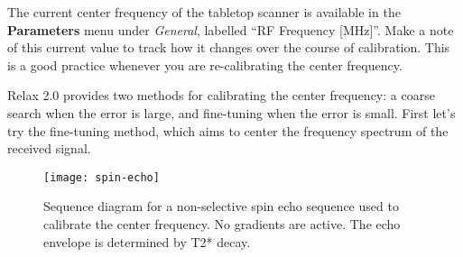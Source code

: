The current center frequency of the tabletop scanner is available in the \textbf{Parameters} menu under \emph{General}, labelled ``RF Frequency [MHz]''. Make a note of this current value to track how it changes over the course of calibration. This is a good practice whenever you are re-calibrating the center frequency.

Relax 2.0 provides two methods for calibrating the center frequency: a coarse search when the error is large, and fine-tuning when the error is small. First let's try the fine-tuning method, which aims to center the frequency spectrum of the received signal.

 \begin{figure}[h]
    \centering
    \vspace{-5mm}
    \texttt{[image: spin-echo]}
    \captionsetup{width=.9\textwidth}
    \caption{\label{fig:calib-spin-echo} Sequence diagram for a non-selective spin echo sequence used to calibrate the center frequency. No gradients are active. The echo envelope is determined by T2* decay.}
\end{figure}


